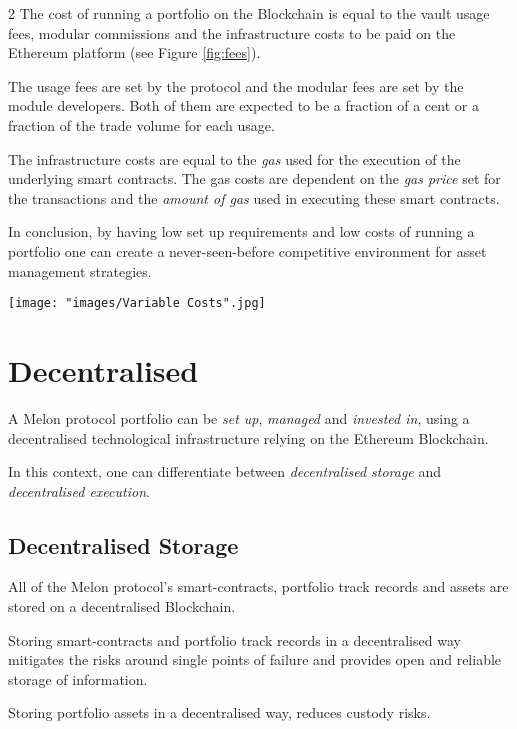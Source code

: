 \documentclass[9pt,oneside]{amsart}
\theoremstyle{plain}
\begin{document}
\begin{multicols}{2}
The cost of running a portfolio on the Blockchain is equal to the vault usage fees, modular commissions and the infrastructure costs to be paid on the Ethereum platform (see Figure \ref{fig:fees}). 

The usage fees are set by the protocol and the modular fees are set by the module developers. Both of them are expected to be a fraction of a cent or a fraction of the trade volume for each usage.

The infrastructure costs are equal to the \textit{gas} used for the execution of the underlying smart contracts. The gas costs are dependent on the \textit{gas price} set for the transactions and the \textit{amount of gas} used in executing these smart contracts\cite{yellow}.

In conclusion, by having low set up requirements and low costs of running a portfolio one can create a never-seen-before competitive environment for asset management strategies.

\begin{figure*}[ht!]
	\centering
	\texttt{[image: "images/Variable Costs".jpg]}
	\caption{Variable Costs of a Melon protocol portfolio}
	\label{fig:fees}
\end{figure*}

\section{Decentralised}\label{sec:decentralised}

A Melon protocol portfolio can be \textit{set up}, \textit{managed} and \textit{invested in}, using a decentralised technological infrastructure relying on the Ethereum Blockchain.

In this context, one can differentiate between \textit{decentralised storage} and \textit{decentralised execution}.

\subsection{Decentralised Storage}

All of the Melon protocol's smart-contracts, portfolio track records and assets are stored on a decentralised Blockchain. 

Storing smart-contracts and portfolio track records in a decentralised way mitigates the risks around single points of failure and provides open and reliable storage of information.

Storing portfolio assets in a decentralised way, reduces custody risks.


\end{multicols}
\end{document}

